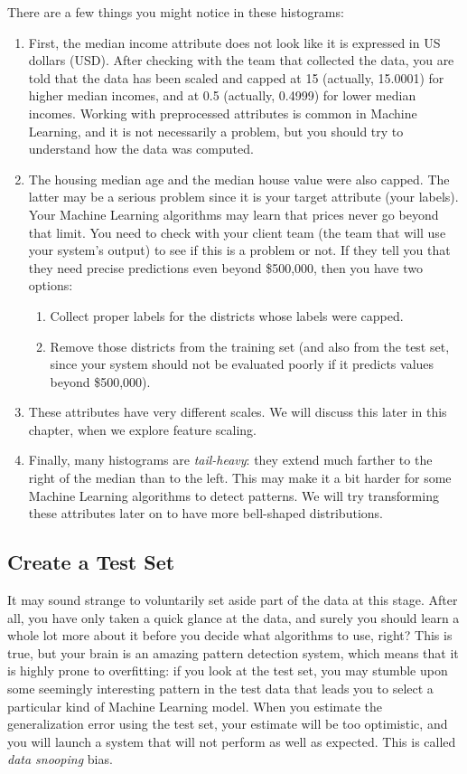 There are a few things you might notice in these histograms:
\begin{enumerate}
\item First, the median income attribute does not look like it is expressed in US dollars
(USD). After checking with the team that collected the data, you are told that the
data has been scaled and capped at 15 (actually, 15.0001) for higher median
incomes, and at 0.5 (actually, 0.4999) for lower median incomes. Working with preprocessed attributes is common in Machine Learning, and it is not necessarily a problem, but you should try to understand how the
data was computed.
\item
The housing median age and the median house value were also capped. The latter may be a serious problem since it is your target attribute (your labels). Your
Machine Learning algorithms may learn that prices never go beyond that limit.
You need to check with your client team (the team that will use your system’s output) to see if this is a problem or not. If they tell you that they need precise predictions even beyond \$500,000, then you have two options:
\begin{enumerate}
\item Collect proper labels for the districts whose labels were capped.
\item Remove those districts from the training set (and also from the test set, since
your system should not be evaluated poorly if it predicts values beyond
\$500,000).
\end{enumerate} 
\item These attributes have very different scales. We will discuss this later in this chapter, when we explore feature scaling.

\item Finally, many histograms are \emph{tail-heavy}: they extend much farther to the right of
the median than to the left. This may make it a bit harder for some Machine
Learning algorithms to detect patterns. We will try transforming these attributes
later on to have more bell-shaped distributions.
\end{enumerate}


\subsection{Create a Test Set}
It may sound strange to voluntarily set aside part of the data at this stage. After all,
you have only taken a quick glance at the data, and surely you should learn a whole
lot more about it before you decide what algorithms to use, right? This is true, but
your brain is an amazing pattern detection system, which means that it is highly
prone to overfitting: if you look at the test set, you may stumble upon some seemingly
interesting pattern in the test data that leads you to select a particular kind of
Machine Learning model. When you estimate the generalization error using the test
set, your estimate will be too optimistic, and you will launch a system that will not
perform as well as expected. This is called \emph{data snooping} bias.

